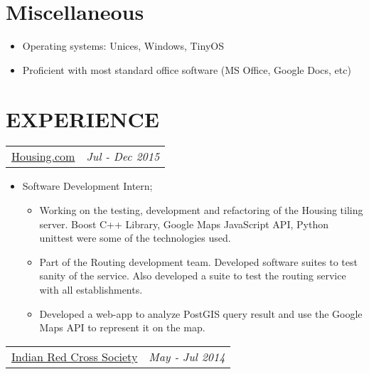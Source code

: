 \documentclass[margin]{res}
\begin{document}
\begin{resume}
\begin{itemize}
\begin{itemize}
                 	\end{itemize}
                 \end{itemize}

\normalsize{\section{Miscellaneous}}
	           \begin{itemize} 
                   \item Operating systems: Unices, Windows, TinyOS
                   \item Proficient with most standard office software (MS Office, Google Docs, etc)
                   \end{itemize}
                  
\section{EXPERIENCE}      
					\begin{tabular}{p{4.2in} r} 
					\href{https://housing.com/in}{Housing.com} &  \textit{Jul - Dec 2015} 
					 \end{tabular}	
                   \begin{itemize} %
                    \item[] Software Development Intern; 
                        \begin{itemize}
                        \item Working on the testing, development and refactoring of the Housing tiling server. Boost C++ Library, Google Maps JavaScript API, Python unittest were some of the technologies used.
                        \item Part of the Routing development team. Developed software suites to test sanity of the service. Also developed a suite to test the routing service with all establishments.   
                        \item Developed a web-app to analyze PostGIS query result and use the Google Maps API to represent it on the map.  
                        \end{itemize}
					 \end{itemize} 
                  \begin{tabular}{p{4.2in} r}  %
                  \href{http://www.indianredcross.org/}{Indian Red Cross Society} &  \textit{May - Jul 2014} 

\end{tabular}
\end{resume}
\end{document}
